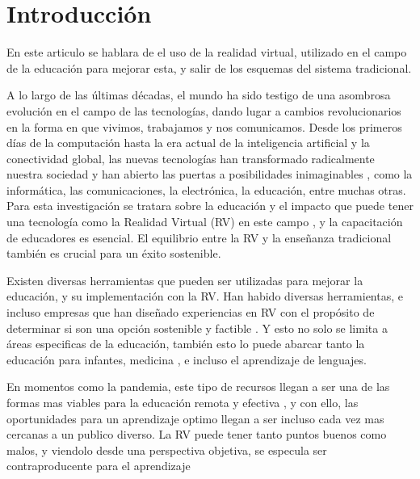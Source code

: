 \section{Introducción}

En este articulo se hablara de el uso de la realidad virtual, utilizado en el campo de la educación para mejorar esta, y salir de los esquemas del sistema tradicional.

A lo largo de las últimas décadas, el mundo ha sido testigo de una asombrosa evolución en el campo de las tecnologías, dando lugar a cambios revolucionarios en la forma en que vivimos, trabajamos y nos comunicamos. Desde los primeros días de la computación hasta la era actual de la inteligencia artificial y la conectividad global, las nuevas tecnologías han transformado radicalmente nuestra sociedad y han abierto las puertas a posibilidades inimaginables \parencite{zheng1998virtual}, como la informática, las comunicaciones, la electrónica, la educación, entre muchas otras. Para esta investigación se tratara sobre la educación y el impacto que puede tener una tecnología como la Realidad Virtual (RV) en este campo \parencite{garcia2020}, y la capacitación de educadores es esencial. El equilibrio entre la RV y la enseñanza tradicional también es crucial para un éxito sostenible.

Existen diversas herramientas que pueden ser utilizadas para mejorar la educación, y su implementación con la RV. Han habido diversas herramientas, e incluso empresas que han diseñado experiencias en RV con el propósito de determinar si son una opción sostenible y factible \parencite{SHIM2023100010}. Y esto no solo se limita a áreas especificas de la educación, también esto lo puede abarcar tanto la educación para infantes, medicina \parencite{GUERRERO2022100002}, e incluso el aprendizaje de lenguajes. \parencite{YUDINTSEVA2023100018, ZAMMIT2023100035}

En momentos como la pandemia, este tipo de recursos llegan a ser una de las formas mas viables para la educación remota y efectiva \parencite{GUERRERO2022100002}, y con ello, las oportunidades para un aprendizaje optimo llegan a ser incluso cada vez mas cercanas a un publico diverso. La RV puede tener tanto puntos buenos como malos, y viendolo desde una perspectiva objetiva, se especula ser contraproducente para el aprendizaje \parencite{OJE2023100033}




